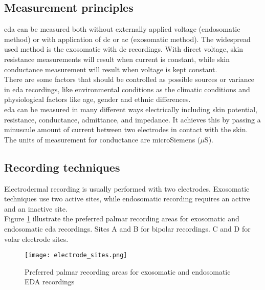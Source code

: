 \subsection{Measurement principles}
\gls{eda} can be measured both without externally applied voltage (endosomatic method) or with application of \gls{dc} or \gls{ac} (exosomatic method). The widespread used method is the exosomatic with \gls{dc} recordings. With direct voltage, skin resistance measurements will result when current is constant, while skin conductance measurement will result when voltage is kept constant.
\\ \indent
There are some factors that should be controlled as possible sources or variance in \gls{eda} recordings, like environmental conditions as the climatic conditions and physiological factors like age, gender and ethnic differences.
\\ \indent
\gls{eda} can be measured in many different ways electrically including skin potential, resistance, conductance, admittance, and impedance. It achieves this by passing a minuscule amount of current between two electrodes in contact with the skin. The units of measurement for conductance are microSiemens ($\mu$S).

\subsection{Recording techniques}
Electrodermal recording is usually performed with two electrodes. Exosomatic techniques use two active sites, while endosomatic recording requires an active and an inactive site.
\\
Figure \ref{fig:electrode_sites} illustrate the preferred palmar recording areas for exosomatic and endosomatic \gls{eda} recordings. Sites A and B for bipolar recordings. C and D for volar electrode sites.
\begin{figure}[h]
    \centering
    \texttt{[image: electrode\_sites.png]} 
	\caption{Preferred palmar recording areas for exosomatic and endosomatic EDA recordings}
    \label{fig:electrode_sites}
\end{figure}

